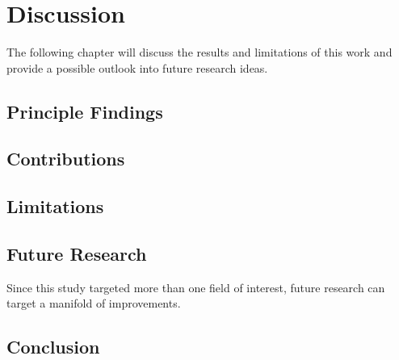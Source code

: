 \section{Discussion}

The following chapter will discuss the results and limitations of this work and provide a possible outlook into future research ideas.

\subsection{Principle Findings}

\subsection{Contributions}

\subsection{Limitations}


\subsection{Future Research}

Since this study targeted more than one field of interest, future research can target a manifold of improvements.

\todo{}

\subsection{Conclusion}